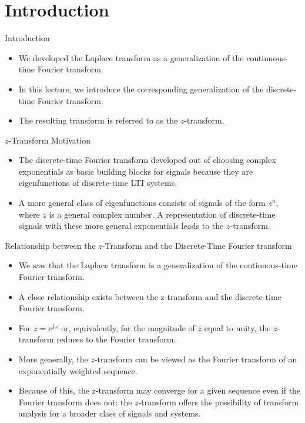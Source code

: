 \section{Introduction}
\begin{frame}{Introduction}
    \begin{itemize}
        \item We developed the Laplace transform as a generalization of the continuous-time Fourier transform.
        \item In this lecture, we introduce the corresponding generalization of the discrete-time Fourier transform.
        \item The resulting transform is referred to as the $z$-transform.
    \end{itemize}
\end{frame}


\begin{frame}{$z$-Transform Motivation}
    \begin{itemize}
        \item The discrete-time Fourier transform developed out of choosing complex exponentials as basic building blocks for signals because they are eigenfunctions of discrete-time LTI systems.
        \item A more general class of eigenfunctions consists of signals of the form $z^n$, where $z$ is a general complex number. A representation of discrete-time signals with these more general exponentials leads to the $z$-transform.
    \end{itemize}
\end{frame}

\begin{frame}{Relationship between the $z$-Transform and the Discrete-Time Fourier transform}
    \begin{itemize}
        \item We saw that the Laplace transform is a generalization of the continuous-time Fourier transform.
        \item A close relationship exists between the z-transform and the discrete-time Fourier transform.
        \item For $z = e^{j\omega}$ or, equivalently, for the magnitude of $z$ equal to unity, the $z$-transform reduces to the Fourier transform.
        \item More generally, the $z$-transform can be viewed as the Fourier transform of an exponentially weighted sequence.
        \item Because of this, the z-transform may converge for a given sequence even if the Fourier transform does not: the $z$-transform offers the possibility of transform analysis for a broader class of signals and systems.
    \end{itemize}
\end{frame}

